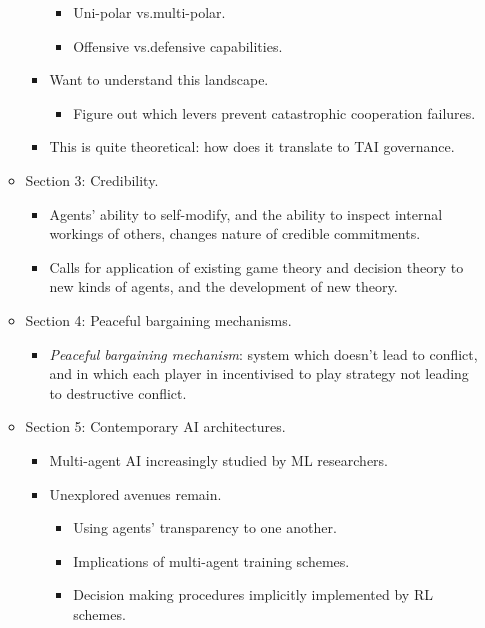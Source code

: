 \begin{itemize}
\begin{itemize}
\begin{itemize}
            \begin{itemize}
                \item Uni-polar vs.\@ multi-polar.
                \item Offensive vs.\@ defensive capabilities.
            \end{itemize}
            \item Want to understand this landscape.
            \begin{itemize}
                \item Figure out which levers prevent catastrophic cooperation failures.
            \end{itemize}
            \item This is quite theoretical: how does it translate to TAI governance.
        \end{itemize}
        \item Section 3: Credibility.
        \begin{itemize}
            \item Agents' ability to self-modify, and the ability to inspect internal workings of others, changes nature of credible commitments.
            \item Calls for application of existing game theory and decision theory to new kinds of agents, and the development of new theory.
        \end{itemize}
        \item Section 4: Peaceful bargaining mechanisms.
        \begin{itemize}
            \item \emph{Peaceful bargaining mechanism}: system which doesn't lead to conflict, and in which each player in incentivised to play strategy not leading to destructive conflict.
        \end{itemize}
        \item Section 5: Contemporary AI architectures.
        \begin{itemize}
            \item Multi-agent AI increasingly studied by ML researchers.
            \item Unexplored avenues remain.
            \begin{itemize}
                \item Using agents' transparency to one another.
                \item Implications of multi-agent training schemes.
                \item Decision making procedures implicitly implemented by RL schemes.

\end{itemize}
\end{itemize}
\end{itemize}
\end{itemize}
